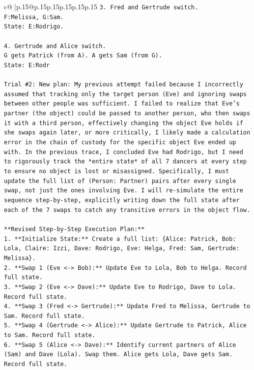 \documentclass{article}
\begin{document}
{\begin{supertabular}{c@{$\;$}|p{.15\linewidth}@{}p{.15\linewidth}p{.15\linewidth}p{.15\linewidth}p{.15\linewidth}p{.15\linewidth}}
{{{\texttt{3. Fred and Gertrude switch.} \\
\texttt{F:Melissa, G:Sam.} \\
\texttt{State: E:Rodrigo.} \\
\\ 
\texttt{4. Gertrude and Alice switch.} \\
\texttt{G gets Patrick (from A). A gets Sam (from G).} \\
\texttt{State: E:Rodr} \\
\\ 
\texttt{Trial \#2: New plan: My previous attempt failed because I incorrectly assumed that tracking only the target person (Eve) and ignoring swaps between other people was sufficient. I failed to realize that Eve's partner (the object) could be passed to another person, who then swaps it with a third person, effectively changing the object Eve holds if she swaps again later, or more critically, I likely made a calculation error in the chain of custody for the specific object Eve ended up with. In the previous trace, I concluded Eve had Rodrigo, but I need to rigorously track the *entire state* of all 7 dancers at every step to ensure no object is lost or misassigned. Specifically, I must update the full list of (Person: Partner) pairs after every single swap, not just the ones involving Eve. I will re{-}simulate the entire sequence step{-}by{-}step, explicitly writing down the full state after each of the 7 swaps to catch any transitive errors in the object flow.} \\
\\ 
\texttt{**Revised Step{-}by{-}Step Execution Plan:**} \\
\texttt{1.  **Initialize State:** Create a full list: \{Alice: Patrick, Bob: Lola, Claire: Izzi, Dave: Rodrigo, Eve: Helga, Fred: Sam, Gertrude: Melissa\}.} \\
\texttt{2.  **Swap 1 (Eve <{-}> Bob):** Update Eve to Lola, Bob to Helga. Record full state.} \\
\texttt{3.  **Swap 2 (Eve <{-}> Dave):** Update Eve to Rodrigo, Dave to Lola. Record full state.} \\
\texttt{4.  **Swap 3 (Fred <{-}> Gertrude):** Update Fred to Melissa, Gertrude to Sam. Record full state.} \\
\texttt{5.  **Swap 4 (Gertrude <{-}> Alice):** Update Gertrude to Patrick, Alice to Sam. Record full state.} \\
\texttt{6.  **Swap 5 (Alice <{-}> Dave):** Identify current partners of Alice (Sam) and Dave (Lola). Swap them. Alice gets Lola, Dave gets Sam. Record full state.} \\
}}}
\end{supertabular}}
\end{document}
